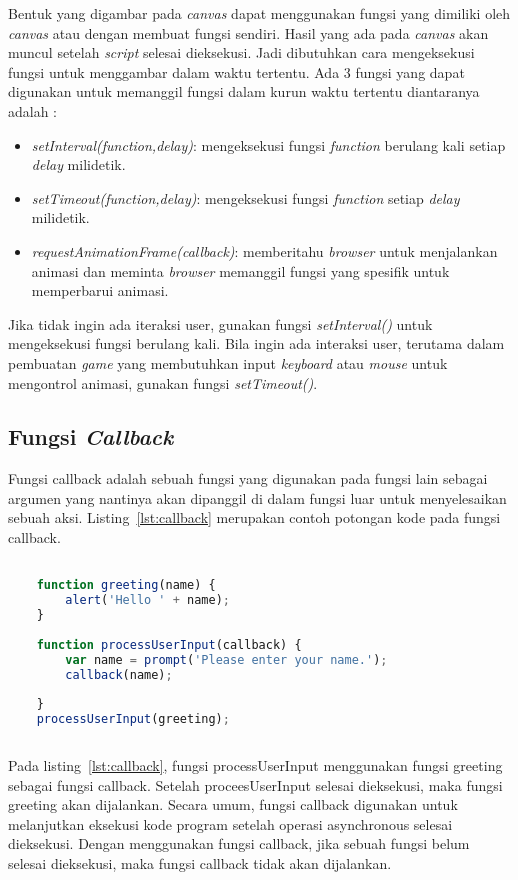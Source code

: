 Bentuk yang digambar pada \textit{canvas} dapat menggunakan fungsi yang dimiliki oleh \textit{canvas} atau dengan membuat fungsi sendiri. Hasil yang ada pada \textit{canvas} akan muncul setelah \textit{script} selesai dieksekusi. Jadi dibutuhkan cara mengeksekusi fungsi untuk menggambar dalam waktu tertentu. Ada 3 fungsi yang dapat digunakan untuk memanggil fungsi dalam kurun waktu tertentu diantaranya adalah :

\begin{itemize}
	\item \textit{setInterval(function,delay)}: mengeksekusi fungsi \textit{function} berulang kali setiap \textit{delay} milidetik.
	\item \textit{setTimeout(function,delay)}: mengeksekusi fungsi \textit{function} setiap \textit{delay} milidetik.
	\item \textit{requestAnimationFrame(callback)}: memberitahu \textit{browser} untuk menjalankan animasi dan meminta \textit{browser} memanggil fungsi yang spesifik untuk memperbarui animasi.
\end{itemize}

Jika tidak ingin ada iteraksi user, gunakan fungsi \textit{setInterval()} untuk mengeksekusi fungsi berulang kali. Bila ingin ada interaksi user, terutama dalam pembuatan \textit{game} yang membutuhkan input \textit{keyboard} atau \textit{mouse} untuk mengontrol animasi, gunakan fungsi \textit{setTimeout()}.

\subsection{Fungsi \textit{Callback}}
Fungsi callback adalah sebuah fungsi yang digunakan pada fungsi lain sebagai argumen yang nantinya akan dipanggil di dalam fungsi luar untuk menyelesaikan sebuah aksi. Listing~\ref{lst:callback} merupakan contoh potongan kode pada fungsi callback.

\begin{lstlisting}[language=Javascript, caption=Contoh fungsi callback, label={lst:callback}]

	function greeting(name) {
  		alert('Hello ' + name);
	}
	
	function processUserInput(callback) {
  		var name = prompt('Please enter your name.');
  		callback(name);
	
	}
	processUserInput(greeting);
	
\end{lstlisting}

Pada listing~\ref{lst:callback}, fungsi processUserInput menggunakan fungsi greeting sebagai fungsi callback. Setelah proceesUserInput selesai dieksekusi, maka fungsi greeting akan dijalankan. Secara umum, fungsi callback digunakan untuk melanjutkan eksekusi kode program setelah operasi asynchronous selesai dieksekusi. Dengan menggunakan fungsi callback, jika sebuah fungsi belum selesai dieksekusi, maka fungsi callback tidak akan dijalankan.


